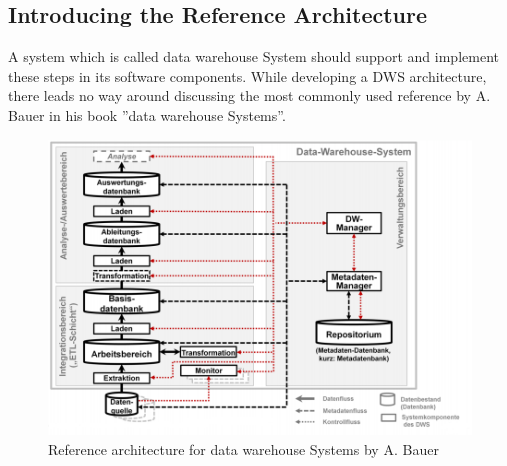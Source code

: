 \subsection{Introducing the Reference Architecture}
A system which is called data warehouse System should support and implement these steps in its software components. While developing a DWS architecture, there leads no way around discussing the most commonly used reference by A. Bauer in his book ''data warehouse Systems''.\cite{dwsRefArchitecture}\newline
\begin{figure}[htb]
    \centering
    \includegraphics[scale=0.45]{pictures/DataWarehouseReferenceArchitecture.png}
    \caption{Reference architecture for data warehouse Systems by A. Bauer \cite[p.~42]{dwsRefArchitecture}}
    \label{fig:referenceArchitecture}
\end{figure} 


